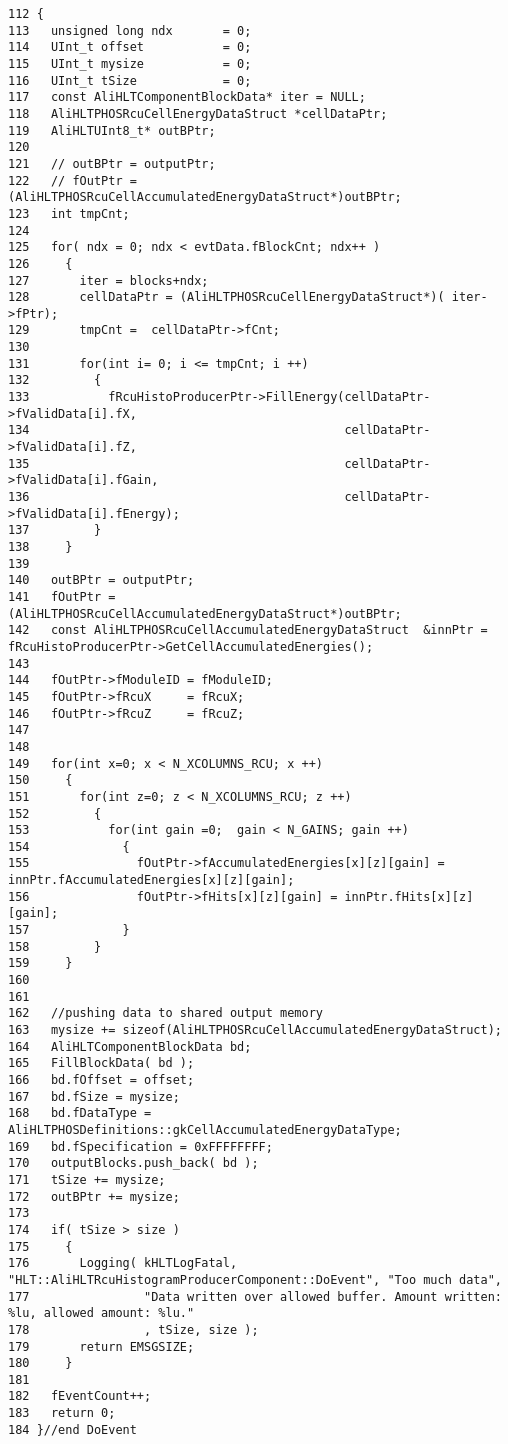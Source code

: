 \footnotesize\begin{verbatim}112 {
113   unsigned long ndx       = 0;
114   UInt_t offset           = 0; 
115   UInt_t mysize           = 0;
116   UInt_t tSize            = 0;
117   const AliHLTComponentBlockData* iter = NULL;   
118   AliHLTPHOSRcuCellEnergyDataStruct *cellDataPtr;
119   AliHLTUInt8_t* outBPtr;
120  
121   // outBPtr = outputPtr;
122   // fOutPtr =  (AliHLTPHOSRcuCellAccumulatedEnergyDataStruct*)outBPtr;
123   int tmpCnt;
124 
125   for( ndx = 0; ndx < evtData.fBlockCnt; ndx++ )
126     {
127       iter = blocks+ndx;
128       cellDataPtr = (AliHLTPHOSRcuCellEnergyDataStruct*)( iter->fPtr);
129       tmpCnt =  cellDataPtr->fCnt;
130 
131       for(int i= 0; i <= tmpCnt; i ++)
132         {
133           fRcuHistoProducerPtr->FillEnergy(cellDataPtr->fValidData[i].fX,
134                                            cellDataPtr->fValidData[i].fZ, 
135                                            cellDataPtr->fValidData[i].fGain, 
136                                            cellDataPtr->fValidData[i].fEnergy);
137         }
138     }
139   
140   outBPtr = outputPtr;
141   fOutPtr =  (AliHLTPHOSRcuCellAccumulatedEnergyDataStruct*)outBPtr;
142   const AliHLTPHOSRcuCellAccumulatedEnergyDataStruct  &innPtr = fRcuHistoProducerPtr->GetCellAccumulatedEnergies();
143 
144   fOutPtr->fModuleID = fModuleID;
145   fOutPtr->fRcuX     = fRcuX;
146   fOutPtr->fRcuZ     = fRcuZ;
147 
148 
149   for(int x=0; x < N_XCOLUMNS_RCU; x ++)
150     {
151       for(int z=0; z < N_XCOLUMNS_RCU; z ++)
152         {
153           for(int gain =0;  gain < N_GAINS; gain ++)
154             {
155               fOutPtr->fAccumulatedEnergies[x][z][gain] = innPtr.fAccumulatedEnergies[x][z][gain];
156               fOutPtr->fHits[x][z][gain] = innPtr.fHits[x][z][gain];
157             }
158         }
159     }
160 
161 
162   //pushing data to shared output memory
163   mysize += sizeof(AliHLTPHOSRcuCellAccumulatedEnergyDataStruct);
164   AliHLTComponentBlockData bd;
165   FillBlockData( bd );
166   bd.fOffset = offset;
167   bd.fSize = mysize;
168   bd.fDataType = AliHLTPHOSDefinitions::gkCellAccumulatedEnergyDataType;
169   bd.fSpecification = 0xFFFFFFFF;
170   outputBlocks.push_back( bd );
171   tSize += mysize;
172   outBPtr += mysize;
173 
174   if( tSize > size )
175     {
176       Logging( kHLTLogFatal, "HLT::AliHLTRcuHistogramProducerComponent::DoEvent", "Too much data",
177                "Data written over allowed buffer. Amount written: %lu, allowed amount: %lu."
178                , tSize, size );
179       return EMSGSIZE;
180     }
181 
182   fEventCount++; 
183   return 0;
184 }//end DoEvent
\end{verbatim}\normalsize 


